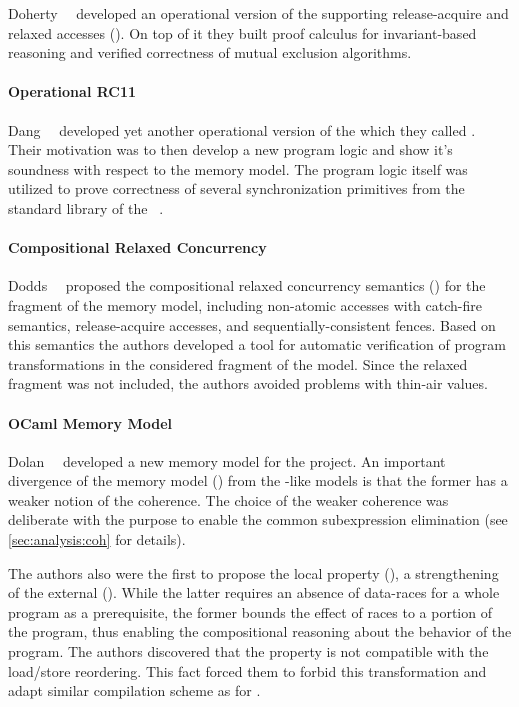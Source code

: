 Doherty~\etal~\cite{Doherty-al:PPoPP19} developed an 
operational version of the \RCMM supporting 
release-acquire and relaxed accesses (\RAR). 
On top of it they built proof calculus for 
invariant-based reasoning and verified 
correctness of mutual exclusion algorithms. 

\paragraph{Operational RC11}

Dang~\etal~\cite{Dang-al:POPL19} developed yet another 
operational version of the \RCMM which they called \ORCMM. 
Their motivation was to then develop a 
new program logic and show it's soundness
with respect to the \ORCMM memory model. 
The program logic itself was utilized to 
prove correctness of several synchronization primitives 
from the standard library of the \Rust~\cite{RustBook:19}.

\paragraph{Compositional Relaxed Concurrency}

Dodds~\etal~\cite{Dodds-al:ESOP18} proposed the  
compositional relaxed concurrency semantics (\CRC) 
for the fragment of the \CMM memory model, 
including non-atomic accesses with catch-fire semantics, 
release-acquire accesses, and sequentially-consistent fences. 
Based on this semantics the authors developed 
a tool for automatic verification of program transformations
in the considered fragment of the \CMM model. 
Since the relaxed fragment was not included, 
the authors avoided problems with thin-air values. 

\paragraph{OCaml Memory Model}

Dolan~\etal~\cite{Dolan-al:PLDI18} developed a new 
memory model for the \MOCaml project. 
An important divergence of the \OCaml memory model (\OCMM)
from the \CMM-like models is that the former 
has a weaker notion of the coherence.
The choice of the weaker coherence was deliberate 
with the purpose to enable the common subexpression elimination
(see \cref{sec:analysis:coh} for details).

The authors also were the first to propose the local \DRF property (\lDRF),
a strengthening of the external \DRF (\eDRF). 
While the latter requires an absence of data-races 
for a whole program as a prerequisite, 
the former bounds the effect of races 
to a portion of the program, thus 
enabling the compositional reasoning 
about the behavior of the program. 
The authors discovered that the \lDRF property 
is not compatible with the load/store reordering.
This fact forced them to forbid this transformation
and adapt similar compilation scheme as for \RCMM. 


